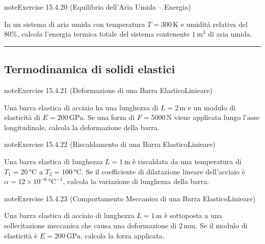 \documentclass[letterpaper,10pt,italian]{jupyterBook}
\begin{document}
\begin{sphinxadmonition}{note}{Exercise 15.4.20 (Equilibrio dell’Aria Umida – Energia)}



\sphinxAtStartPar
In un sistema di aria umida con temperatura \(T = 300 \, \text{K}\) e umidità relativa del \(80\%\), calcola l’energia termica totale del sistema contenente \(1 \, \text{m}^3\) di aria umida.
\end{sphinxadmonition}


\bigskip\hrule\bigskip



\subsection{Termodinamica di solidi elastici}
\label{\detokenize{ch/thermodynamics/matter-problems:termodinamica-di-solidi-elastici}} \label{exercise:ch/thermodynamics/matter-problems-exercise-20}

\begin{sphinxadmonition}{note}{Exercise 15.4.21 (Deformazione di una Barra Elastico\sphinxhyphen{}Linieare)}



\sphinxAtStartPar
Una barra elastica di acciaio ha una lunghezza di \(L = 2 \, \text{m}\) e un modulo di elasticità di \(E = 200 \, \text{GPa}\). Se una forza di \(F = 5000 \, \text{N}\) viene applicata lungo l’asse longitudinale, calcola la deformazione della barra.
\end{sphinxadmonition}
 \label{exercise:ch/thermodynamics/matter-problems-exercise-21}

\begin{sphinxadmonition}{note}{Exercise 15.4.22 (Riscaldamento di una Barra Elastico\sphinxhyphen{}Linieare)}



\sphinxAtStartPar
Una barra elastica di lunghezza \(L = 1 \, \text{m}\) è riscaldata da una temperatura di \(T_1 = 20 \, \text{°C}\) a \(T_2 = 100 \, \text{°C}\). Se il coefficiente di dilatazione lineare dell’acciaio è \( \alpha = 12 \times 10^{-6} \, \text{°C}^{-1}\), calcola la variazione di lunghezza della barra.
\end{sphinxadmonition}
 \label{exercise:ch/thermodynamics/matter-problems-exercise-22}

\begin{sphinxadmonition}{note}{Exercise 15.4.23 (Comportamento Meccanico di una Barra Elastico\sphinxhyphen{}Linieare)}



\sphinxAtStartPar
Una barra elastica di acciaio di lunghezza \(L = 1 \, \text{m}\) è sottoposta a una sollecitazione meccanica che causa una deformazione di \(2 \, \text{mm}\). Se il modulo di elasticità è \(E = 200 \, \text{GPa}\), calcola la forza applicata.
\end{sphinxadmonition}
\end{document}

